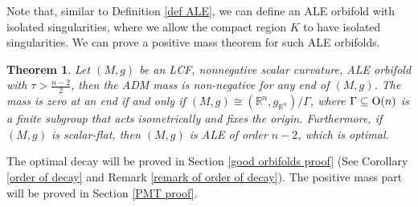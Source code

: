 \documentclass[12pt]{amsart}
\newtheorem{theorem}{Theorem}[section]
\theoremstyle{definition}
\begin{document}




Note that, similar to Definition \ref{def ALE}, we can define an ALE orbifold with isolated singularities, where we allow the compact region $K$ to have isolated singularities.
We can prove a positive mass theorem for such ALE orbifolds.
\begin{theorem}\label{PMT}
    Let $(M,g)$ be an LCF, nonnegative scalar curvature, ALE orbifold with $\tau > \frac{n-2}{2}$, then the ADM mass is non-negative for any end of $(M,g)$. The mass is zero at an end if and only if $(M,g)\cong (\mathbb{R}^n,g_{\mathbb{R}^n})/\Gamma$, where $\Gamma\subseteq {\rm{O}}(n)$ is a finite subgroup that acts isometrically and fixes the origin.
    Furthermore, if $(M,g)$ is scalar-flat, then $(M,g)$ is ALE of order $n-2$, which is optimal.
\end{theorem}
The optimal decay will be proved in Section \ref{good orbifolds proof} (See Corollary \ref{order of decay} and Remark \ref{remark of order of decay}). The positive mass part will be proved in Section \ref{PMT proof}. 
\end{document}
